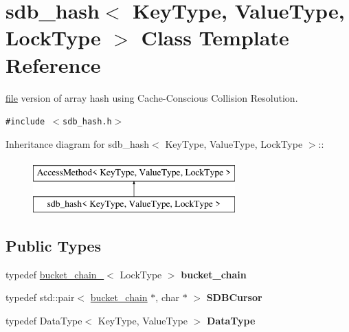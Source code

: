 \hypertarget{classsdb__hash}{
\section{sdb\_\-hash$<$ KeyType, ValueType, LockType $>$ Class Template Reference}
\label{classsdb__hash}
}
\hyperlink{classfile}{file} version of array hash using Cache-Conscious Collision Resolution.  


{\tt \#include $<$sdb\_\-hash.h$>$}

Inheritance diagram for sdb\_\-hash$<$ KeyType, ValueType, LockType $>$::\begin{figure}[H]
\begin{center}
\leavevmode
\includegraphics[height=2cm]{classsdb__hash}
\end{center}
\end{figure}
\subsection*{Public Types}
\begin{CompactItemize}
\item 
\hypertarget{classsdb__hash_5968365ee85645ab1b3cdf20a080b96c}{
typedef \hyperlink{classbucket__chain__}{bucket\_\-chain\_\-}$<$ LockType $>$ \textbf{bucket\_\-chain}}
\label{classsdb__hash_5968365ee85645ab1b3cdf20a080b96c}

\item 
\hypertarget{classsdb__hash_99cf7f90f1aabe92eb592ab73cc34eeb}{
typedef std::pair$<$ \hyperlink{classbucket__chain__}{bucket\_\-chain} $\ast$, char $\ast$ $>$ \textbf{SDBCursor}}
\label{classsdb__hash_99cf7f90f1aabe92eb592ab73cc34eeb}

\item 
\hypertarget{classsdb__hash_2af15a87cb82b406d6a79631a2f03431}{
typedef DataType$<$ KeyType, ValueType $>$ \textbf{DataType}}
\label{classsdb__hash_2af15a87cb82b406d6a79631a2f03431}

\end{CompactItemize}
